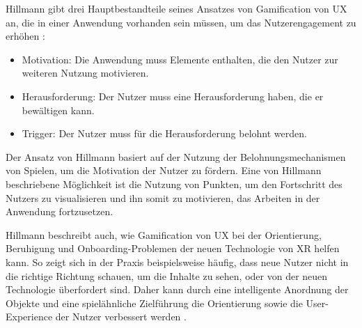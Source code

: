 Hillmann gibt drei Hauptbestandteile seines Ansatzes von Gamification von UX an, die in einer Anwendung vorhanden sein müssen, um das Nutzerengagement zu erhöhen \autocite[S.66]{hillmann2021ux}:
\begin{itemize}
  \item Motivation: Die Anwendung muss Elemente enthalten, die den Nutzer zur weiteren Nutzung motivieren.
  \item Herausforderung: Der Nutzer muss eine Herausforderung haben, die er bewältigen kann.
  \item Trigger: Der Nutzer muss für die Herausforderung belohnt werden.
\end{itemize}

Der Ansatz von Hillmann basiert auf der Nutzung der Belohnungsmechanismen von Spielen, um die Motivation der Nutzer zu fördern.
Eine von Hillmann beschriebene Möglichkeit ist die Nutzung von Punkten, um den Fortschritt des Nutzers zu visualisieren und ihn somit zu motivieren, das Arbeiten in der Anwendung fortzusetzen.

Hillmann beschreibt auch, wie Gamification von UX bei der Orientierung, Beruhigung und Onboarding-Problemen der neuen Technologie von XR helfen kann.
So zeigt sich in der Praxis beispielsweise häufig, dass neue Nutzer nicht in die richtige Richtung schauen, um die Inhalte zu sehen, oder von der neuen Technologie überfordert sind.
Daher kann durch eine intelligente Anordnung der Objekte und eine spielähnliche Zielführung die Orientierung sowie die User-Experience der Nutzer verbessert werden \autocite[S.67]{hillmann2021ux}.



